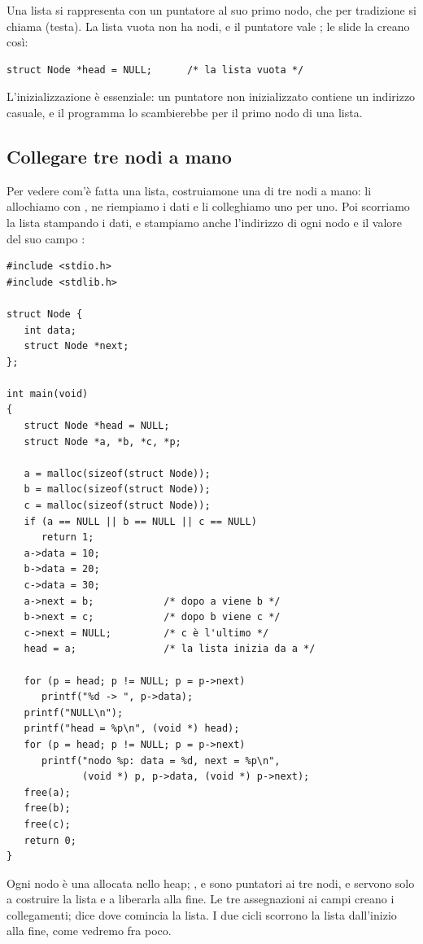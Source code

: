 Una lista si rappresenta con un puntatore al suo primo nodo, che per
tradizione si chiama  (testa). La lista vuota non ha nodi, e il
puntatore vale ; le slide la creano così:

\begin{lstlisting}[style=c]
struct Node *head = NULL;      /* la lista vuota */
\end{lstlisting}

L'inizializzazione è essenziale: un puntatore non inizializzato contiene un
indirizzo casuale, e il programma lo scambierebbe per il primo nodo di una
lista.

\subsection{Collegare tre nodi a mano}

Per vedere com'è fatta una lista, costruiamone una di tre nodi a mano:
li allochiamo con , ne riempiamo i dati e li colleghiamo uno
per uno. Poi scorriamo la lista stampando i dati, e stampiamo anche
l'indirizzo di ogni nodo e il valore del suo campo :

\begin{affianco}[0.62][c]
\begin{lstlisting}[style=c, name=nodi.c]
#include <stdio.h>
#include <stdlib.h>

struct Node {
   int data;
   struct Node *next;
};

int main(void)
{
   struct Node *head = NULL;
   struct Node *a, *b, *c, *p;

   a = malloc(sizeof(struct Node));
   b = malloc(sizeof(struct Node));
   c = malloc(sizeof(struct Node));
   if (a == NULL || b == NULL || c == NULL)
      return 1;
   a->data = 10;
   b->data = 20;
   c->data = 30;
   a->next = b;            /* dopo a viene b */
   b->next = c;            /* dopo b viene c */
   c->next = NULL;         /* c è l'ultimo */
   head = a;               /* la lista inizia da a */

   for (p = head; p != NULL; p = p->next)
      printf("%d -> ", p->data);
   printf("NULL\n");
   printf("head = %p\n", (void *) head);
   for (p = head; p != NULL; p = p->next)
      printf("nodo %p: data = %d, next = %p\n",
             (void *) p, p->data, (void *) p->next);
   free(a);
   free(b);
   free(c);
   return 0;
}
\end{lstlisting}
\risultato
Ogni nodo è una  allocata nello heap; ,  e
 sono puntatori ai tre nodi, e servono solo a costruire la lista e a
liberarla alla fine. Le tre assegnazioni ai campi  creano i
collegamenti;  dice dove comincia la lista. I due cicli
 scorrono la lista dall'inizio alla fine, come vedremo fra poco.
\end{affianco}


